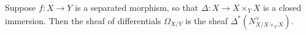 Suppose $f\colon X\to Y$ is a separated morphism,
so that $\Delta\colon X\to X\times_Y X$ is a closed immersion. Then the
sheaf of differentials $\Omega_{X/Y}$ is the sheaf
$\Delta^*(N_{X/X\times_Y X}^{\vee})$.
